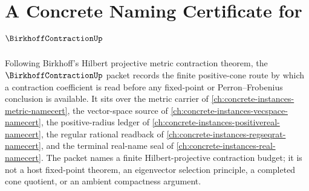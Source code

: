 \chapter{A Concrete Naming Certificate for $\BirkhoffContractionUp$}
\label{ch:concrete-instances-birkhoff-contraction-namecert}

Following Birkhoff's Hilbert projective metric contraction theorem, the $\BirkhoffContractionUp$ packet records the finite positive-cone route by which a contraction coefficient is read before any fixed-point or Perron--Frobenius conclusion is available. It sits over the metric carrier of \autoref{ch:concrete-instances-metric-namecert}, the vector-space source of \autoref{ch:concrete-instances-vecspace-namecert}, the positive-radius ledger of \autoref{ch:concrete-instances-positivereal-namecert}, the regular rational readback of \autoref{ch:concrete-instances-regseqrat-namecert}, and the terminal real-name seal of \autoref{ch:concrete-instances-real-namecert}. The packet names a finite Hilbert-projective contraction budget; it is not a host fixed-point theorem, an eigenvector selection principle, a completed cone quotient, or an ambient compactness argument.


